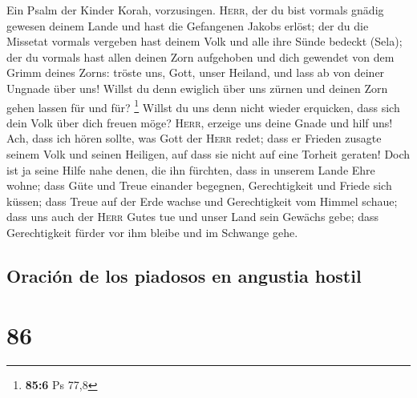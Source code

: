  Ein Psalm der Kinder Korah, vorzusingen. 
\textsc{Herr}, der du bist vormals gnädig gewesen deinem Lande und hast
die Gefangenen Jakobs erlöst;  der du die Missetat vormals
vergeben hast deinem Volk und alle ihre Sünde bedeckt (Sela);
 der du vormals hast allen deinen Zorn aufgehoben und dich
gewendet von dem Grimm deines Zorns:  tröste uns, Gott,
unser Heiland, und lass ab von deiner Ungnade über uns! 
Willst du denn ewiglich über uns zürnen und deinen Zorn gehen lassen für
und für? \footnote{\textbf{85:6} Ps 77,8}  Willst du uns
denn nicht wieder erquicken, dass sich dein Volk über dich freuen möge?
 \textsc{Herr}, erzeige uns deine Gnade und hilf uns!
 Ach, dass ich hören sollte, was Gott der \textsc{Herr}
redet; dass er Frieden zusagte seinem Volk und seinen Heiligen, auf dass
sie nicht auf eine Torheit geraten!  Doch ist ja seine
Hilfe nahe denen, die ihn fürchten, dass in unserem Lande Ehre wohne;
 dass Güte und Treue einander begegnen, Gerechtigkeit und
Friede sich küssen;  dass Treue auf der Erde wachse und
Gerechtigkeit vom Himmel schaue;  dass uns auch der
\textsc{Herr} Gutes tue und unser Land sein Gewächs gebe;
 dass Gerechtigkeit fürder vor ihm bleibe und im Schwange
gehe.

\hypertarget{oraciuxf3n-de-los-piadosos-en-angustia-hostil}{%
\subsection{Oración de los piadosos en angustia
hostil}\label{oraciuxf3n-de-los-piadosos-en-angustia-hostil}}

\hypertarget{section-85}{%
\section{86}\label{section-85}}

